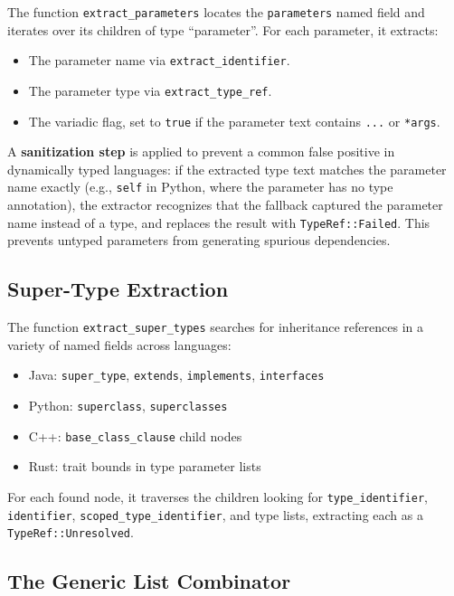 The function \texttt{extract\_parameters} locates the
\texttt{parameters} named field and iterates over its children of
type ``parameter''. For each parameter, it extracts:
\begin{itemize}
  \item The parameter name via \texttt{extract\_identifier}.
  \item The parameter type via \texttt{extract\_type\_ref}.
  \item The variadic flag, set to \texttt{true} if the parameter text
    contains \texttt{...} or \texttt{*args}.
\end{itemize}

A \textbf{sanitization step} is applied to prevent a common false
positive in dynamically typed languages: if the extracted type text
matches the parameter name exactly (e.g., \texttt{self} in Python,
where the parameter has no type annotation), the extractor recognizes
that the fallback captured the parameter name instead of a type, and
replaces the result with \texttt{TypeRef::Failed}. This prevents
untyped parameters from generating spurious dependencies.

\subsection{Super-Type Extraction}

The function \texttt{extract\_super\_types} searches for inheritance
references in a variety of named fields across languages:
\begin{itemize}
  \item Java: \texttt{super\_type}, \texttt{extends},
    \texttt{implements}, \texttt{interfaces}
  \item Python: \texttt{superclass}, \texttt{superclasses}
  \item C++: \texttt{base\_class\_clause} child nodes
  \item Rust: trait bounds in type parameter lists
\end{itemize}

For each found node, it traverses the children looking for
\texttt{type\_identifier}, \texttt{identifier},
\texttt{scoped\_type\_identifier}, and type lists, extracting each as
a \texttt{TypeRef::Unresolved}.

\subsection{The Generic List Combinator}

